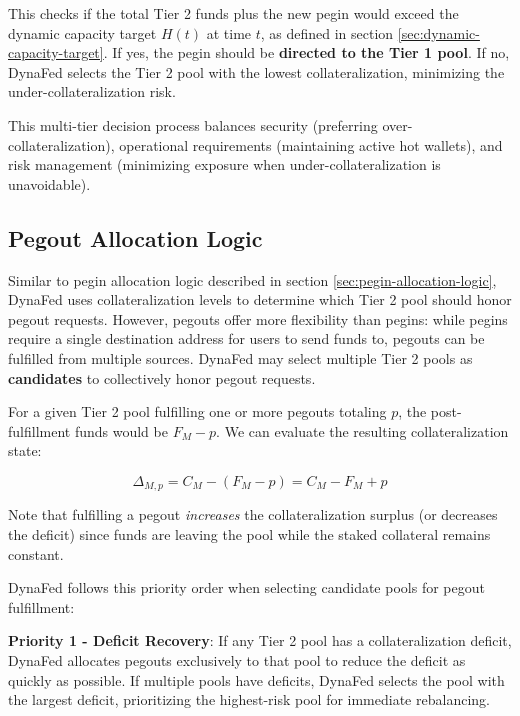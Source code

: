 This checks if the total Tier 2 funds plus the new pegin would exceed the dynamic capacity target $H(t)$ at time $t$, as defined in section \ref{sec:dynamic-capacity-target}. If yes, the pegin should be \textbf{directed to the Tier 1 pool}. If no, DynaFed selects the Tier 2 pool with the lowest collateralization, minimizing the under-collateralization risk.

This multi-tier decision process balances security (preferring over-collateralization), operational requirements (maintaining active hot wallets), and risk management (minimizing exposure when under-collateralization is unavoidable).

\subsection{Pegout Allocation Logic}
\label{sec:pegout-allocation-logic}

Similar to pegin allocation logic described in section \ref{sec:pegin-allocation-logic}, DynaFed uses collateralization levels to determine which Tier 2 pool should honor pegout requests. However, pegouts offer more flexibility than pegins: while pegins require a single destination address for users to send funds to, pegouts can be fulfilled from multiple sources. DynaFed may select multiple Tier 2 pools as \textbf{candidates} to collectively honor pegout requests.

For a given Tier 2 pool fulfilling one or more pegouts totaling $p$, the post-fulfillment funds would be $F_M - p$. We can evaluate the resulting collateralization state:

\begin{equation}
    \Delta_{M,p} = C_M - (F_M - p) = C_M - F_M + p
\end{equation}

Note that fulfilling a pegout \emph{increases} the collateralization surplus (or decreases the deficit) since funds are leaving the pool while the staked collateral remains constant.

DynaFed follows this priority order when selecting candidate pools for pegout fulfillment:

\textbf{Priority 1 - Deficit Recovery}: If any Tier 2 pool has a collateralization deficit, DynaFed allocates pegouts exclusively to that pool to reduce the deficit as quickly as possible. If multiple pools have deficits, DynaFed selects the pool with the largest deficit, prioritizing the highest-risk pool for immediate rebalancing.

